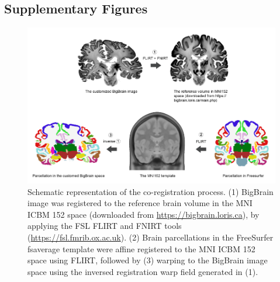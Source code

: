 \begin{refsection}
\subsection*{Supplementary Figures}
 
\begin{figure}[H]
    \centering
    \includegraphics[width=\linewidth]{images/bbFigureS1.png}   
    \caption{Schematic representation of the co-registration process. (1) BigBrain image was registered to the reference brain volume in the MNI ICBM 152 space (downloaded from \url{https://bigbrain.loris.ca}), by applying the FSL FLIRT and FNIRT tools (\url{https://fsl.fmrib.ox.ac.uk}). (2) Brain parcellations in the FreeSurfer fsaverage template were affine registered to the MNI ICBM 152 space using FLIRT, followed by (3) warping to the BigBrain image space using the inversed registration warp field generated in (1).}
    \label{bigbrainFigS1}
\end{figure}


\end{refsection}
